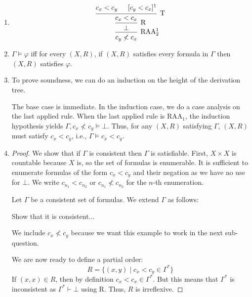\documentclass[a4paper]{article}
\newcommand{\N}{\mathbb{N}}
\begin{document}
\section{}
\begin{enumerate}
\item
  \[\begin{prooftree}
      \hypo{c_{x} < c_{y}}
      \hypo{[c_{y} < c_{x}]^1}
      \infer2[T]{c_{x} < c_{x}}
      \infer1[R]{\bot}
      \infer1[RAA$_{2}^1$]{c_{y} \nless c_{x}}
    \end{prooftree}\]
\item
  $\Gamma \vDash \varphi$ iff for every $(X,R)$, if $(X,R)$ satisfies every formula in $\Gamma$ then $(X,R)$ satisfies $\varphi$.
\item To prove soundness, we can do an induction on the height of the derivation tree.
  
  The base case is immediate.
  In the induction case, we do a case analysis on the last applied rule.
  When the last applied rule is $\text{RAA}_{1}$, the induction hypothesis yields $\Gamma,c_{x} \nless c_{y} \vDash \bot$.
  Thus, for any $(X,R)$ satisfying $\Gamma$, $(X,R)$ must satisfy $c_{x} < c_{y}$, i.e., $\Gamma \vDash c_{x} < c_{y}$.
\item 
  \begin{proof}
    We show that if $\Gamma$ is consistent then $\Gamma$ is satisfiable.
    First, $X \times X$ is countable because $X$ is, so the set of formulas is enumerable.
    It is sufficient to enumerate formulas of the form $c_{x} < c_{y}$ and their negation as we have no use for $\bot$.
    We write $c_{n_1} < c_{n_2}$ or $c_{n_1} \nless c_{n_2}$ for the $n$-th enumeration.

    Let $\Gamma$ be a consistent set of formulas.
    We extend $\Gamma$ as follows:
    Show that it is consistent...

    We include $c_x \nless c_y$ because we want this example to work in the next sub-question.

    We are now ready to define a partial order:
    \[
      R = \{(x,y) \mid c_{x} < c_{y} \in \Gamma^{*}\}
    \]
    If $(x,x) \in R$, then by definition $c_{x} < c_{x} \in \Gamma^{*}$.
    But this means that $\Gamma^{*}$ is inconsistent as $\Gamma^* \vdash \bot$ using R.
    Thus, $R$ is irreflexive.
  \end{proof}
\end{enumerate}

\end{document}
